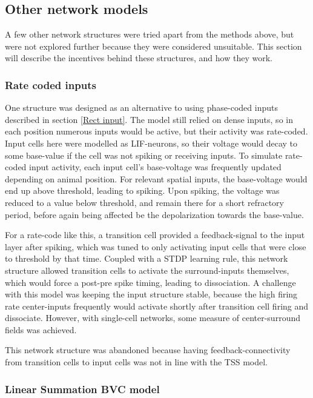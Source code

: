 \documentclass{article}
\begin{document}
    \subsection{Other network models} \label{Other Models}

    A few other network structures were tried apart from the methods above, but were not explored further because they were considered unsuitable. This section will describe the incentives behind these structures, and how they work.

    \subsubsection{Rate coded inputs} \label{Rate input}
    One structure was designed as an alternative to using phase-coded inputs described in section \ref{Rect input}. The model still relied on dense inputs, so in each position numerous inputs would be active, but their activity was rate-coded. Input cells here were modelled as LIF-neurons, so their voltage would decay to some base-value if the cell was not spiking or receiving inputs. To simulate rate-coded input activity, each input cell's base-voltage was frequently updated depending on animal position. For relevant spatial inputs, the base-voltage would end up above threshold, leading to spiking. Upon spiking, the voltage was reduced to a value below threshold, and remain there for a short refractory period, before again being affected be the depolarization towards the base-value.

    For a rate-code like this, a transition cell provided a feedback-signal to the input layer after spiking, which was tuned to only activating input cells that were close to threshold by that time. Coupled with a STDP learning rule, this network structure allowed transition cells to activate the surround-inputs themselves, which would force a post-pre spike timing, leading to dissociation. A challenge with this model was keeping the input structure stable, because the high firing rate center-inputs frequently would activate shortly after transition cell firing and dissociate. However, with single-cell networks, some measure of center-surround fields was achieved.

    This network structure was abandoned because having feedback-connectivity from transition cells to input cells was not in line with the TSS model.

    \subsubsection{Linear Summation BVC model} \label{LinnSummBVC}
    
\end{document}
